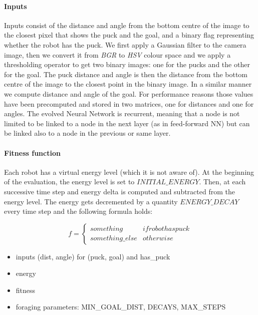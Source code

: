 \documentclass{article}
\begin{document}
	\paragraph{Inputs} %
	\label{par:foraging_inputs}
	Inputs consist of the distance and angle from the bottom centre of the image
	to the closest pixel that shows the puck and the goal, and a binary flag
	representing whether the robot has the puck. We first apply a Gaussian filter
	to the camera image, then we convert it from \textit{BGR} to \textit{HSV}
	colour space and we apply a thresholding operator to get two binary images:
	one for the pucks and the other for the goal. The puck distance and angle is
	then the distance from the bottom centre of the image to the closest point
	in the binary image. In a similar manner we compute distance and angle of
	the goal. For performance reasons those values have been precomputed and
	stored in two matrices, one for distances and one for angles.
	The evolved Neural Network is recurrent, meaning that a node is not limited
	to be linked to a node in the next layer (as in feed-forward NN) but can be
	linked also to a node in the previous or same layer.

	\paragraph{Fitness function} %
	\label{par:foraging_fitness}
	Each robot has a virtual energy level (which it is not aware of). At the
	beginning of the evaluation, the energy level is set to $INITIAL\_ENERGY$.
	Then, at each successive time step and energy delta is computed and
	subtracted from the energy level. The energy gets decremented by a quantity
	$ENERGY\_DECAY$ every time step and the following formula holds:
	
	$$
	f=
	\begin{cases}
		something & ifrobothaspuck \\
		something\_else & {otherwise}
	\end{cases}
	$$

	\begin{itemize}
		\item inputs (dist, angle) for (puck, goal) and has\_puck
		\item energy
		\item fitness
		\item foraging parameters: MIN\_GOAL\_DIST, DECAYS, MAX\_STEPS
	\end{itemize}
\end{document}
